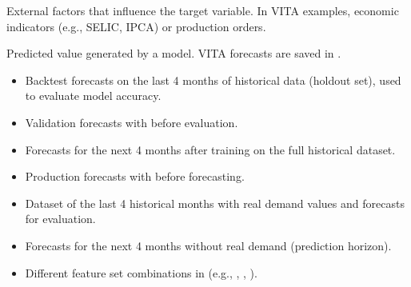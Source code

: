 \documentclass[letterpaper,10pt,english]{sphinxmanual}
\begin{document}
\begin{description}
\sphinxAtStartPar
External factors that influence the target variable. In VITA examples,
economic indicators (e.g., SELIC, IPCA) or production orders.

\sphinxAtStartPar
Predicted value generated by a model. VITA forecasts are saved in
.

\begin{itemize}
\item {} 
\sphinxAtStartPar
{} \textendash{} Backtest forecasts on the last 4 months of historical data
(holdout set), used to evaluate model accuracy.

\item {} 
\sphinxAtStartPar
{} \textendash{} Validation forecasts with 
before evaluation.

\item {} 
\sphinxAtStartPar
{} \textendash{} Forecasts for the next 4 months after training on the
full historical dataset.

\item {} 
\sphinxAtStartPar
{} \textendash{} Production forecasts with 
before forecasting.

\item {} 
\sphinxAtStartPar
{} \textendash{} Dataset of the last 4 historical months with real demand
values and forecasts for evaluation.

\item {} 
\sphinxAtStartPar
{} \textendash{} Forecasts for the next 4 months without real demand
(prediction horizon).

\item {} 
\sphinxAtStartPar
{} \textendash{} Different feature set combinations in 
(e.g., , , ).


\end{itemize}
\end{description}
\end{document}
